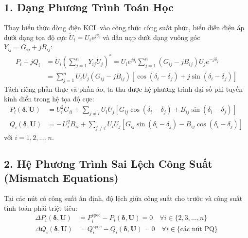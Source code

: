 \documentclass[12pt,a4paper,oneside]{report}
\begin{document}
\subsection{1. Dạng Phương Trình Toán Học}
Thay biểu thức dòng điện KCL vào công thức công suất phức, biểu diễn điện áp dưới dạng tọa độ cực $\dot{U}_i = U_i e^{j\delta_i}$ và dẫn nạp dưới dạng vuông góc $Y_{ij} = G_{ij} + jB_{ij}$:
\begin{align}
P_i + jQ_i &= \dot{U}_i \left( \sum_{j=1}^n Y_{ij} \dot{U}_j \right)^* = U_i e^{j\delta_i} \sum_{j=1}^n (G_{ij} - jB_{ij}) U_j e^{-j\delta_j} \nonumber \\
&= \sum_{j=1}^n U_i U_j (G_{ij} - jB_{ij}) \left[ \cos(\delta_i - \delta_j) + j \sin(\delta_i - \delta_j) \right]
\end{align}
Tách riêng phần thực và phần ảo, ta thu được hệ phương trình đại số phi tuyến kinh điển trong hệ tọa độ cực:
\begin{align}
P_i(\boldsymbol{\delta}, \mathbf{U}) &= U_i^2 G_{ii} + \sum_{j \ne i} U_i U_j \left[ G_{ij} \cos(\delta_i - \delta_j) + B_{ij} \sin(\delta_i - \delta_j) \right] \label{eq:p_polar} \\
Q_i(\boldsymbol{\delta}, \mathbf{U}) &= -\, U_i^2 B_{ii} + \sum_{j \ne i} U_i U_j \left[ G_{ij} \sin(\delta_i - \delta_j) - B_{ij} \cos(\delta_i - \delta_j) \right] \label{eq:q_polar}
\end{align}
với $i = 1, 2, \dots, n$.

\subsection{2. Hệ Phương Trình Sai Lệch Công Suất (Mismatch Equations)}
Tại các nút có công suất ấn định, độ lệch giữa công suất cho trước và công suất tính toán phải triệt tiêu:
\begin{align}
\Delta P_i(\boldsymbol{\delta}, \mathbf{U}) &= P_i^{\text{spec}} - P_i(\boldsymbol{\delta}, \mathbf{U}) = 0 \quad \forall i \in \{2, 3, \dots, n\} \\
\Delta Q_i(\boldsymbol{\delta}, \mathbf{U}) &= Q_i^{\text{spec}} - Q_i(\boldsymbol{\delta}, \mathbf{U}) = 0 \quad \forall i \in \{\text{các nút PQ}\}
\end{align}
\end{document}
